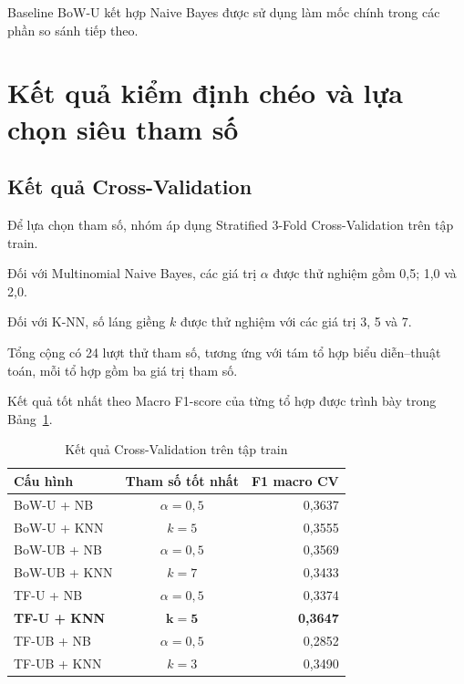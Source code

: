 Baseline BoW-U kết hợp Naive Bayes được sử dụng
làm mốc chính trong các phần so sánh tiếp theo.


\section{Kết quả kiểm định chéo và lựa chọn siêu tham số}

\subsection{Kết quả Cross-Validation}

Để lựa chọn tham số, nhóm áp dụng
Stratified 3-Fold Cross-Validation trên tập train.

Đối với Multinomial Naive Bayes, các giá trị
$\alpha$ được thử nghiệm gồm 0,5; 1,0 và 2,0.

Đối với K-NN, số láng giềng $k$ được thử nghiệm
với các giá trị 3, 5 và 7.

Tổng cộng có 24 lượt thử tham số, tương ứng với
tám tổ hợp biểu diễn--thuật toán, mỗi tổ hợp
gồm ba giá trị tham số.

Kết quả tốt nhất theo Macro F1-score của từng
tổ hợp được trình bày trong
Bảng~\ref{tab:ch4-ketqua-cv}.

\begin{table}[H]
\centering
\caption{Kết quả Cross-Validation trên tập train}
\label{tab:ch4-ketqua-cv}
\renewcommand{\arraystretch}{1.15}
\small

\begin{tabularx}{\textwidth}{|X|c|r|}
\hline
\textbf{Cấu hình}
& \textbf{Tham số tốt nhất}
& \textbf{F1 macro CV} \\
\hline

BoW-U + NB
& $\alpha=0,5$
& 0,3637 \\
\hline

BoW-U + KNN
& $k=5$
& 0,3555 \\
\hline

BoW-UB + NB
& $\alpha=0,5$
& 0,3569 \\
\hline

BoW-UB + KNN
& $k=7$
& 0,3433 \\
\hline

TF-U + NB
& $\alpha=0,5$
& 0,3374 \\
\hline

\textbf{TF-U + KNN}
& $\boldsymbol{k=5}$
& \textbf{0,3647} \\
\hline

TF-UB + NB
& $\alpha=0,5$
& 0,2852 \\
\hline

TF-UB + KNN
& $k=3$
& 0,3490 \\
\hline

\end{tabularx}
\end{table}

